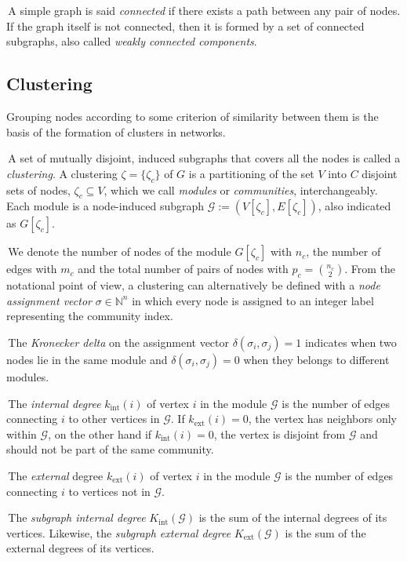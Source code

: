 \documentclass[11pt,              a4paper,              twoside,openright,              titlepage,              headinclude,footinclude,                            numbers=noenddot,              cleardoublepage=empty,]{scrreprt}
\begin{document}
\noindent\textbullet \,A simple graph is said \emph{connected} if there exists a path between any pair of nodes.
If the graph itself is not connected, then it is formed by a set of connected subgraphs, also called \emph{weakly connected components}.


\subsection{Clustering}\label{sec:clustering}
Grouping nodes according to some criterion of similarity between them is the basis of the formation of clusters in networks.

\noindent\textbullet \,A set of mutually disjoint, induced subgraphs that covers all the nodes is called a \emph{clustering}.
A clustering $\zeta = \{\zeta_c\}$ of $G$ is a partitioning of the set $V$ into $C$ disjoint sets of nodes, $\zeta_c \subseteq V$, which we call \emph{modules} or \emph{communities}, interchangeably.
Each module is a node-induced subgraph $\mathcal{G}:=(V[\zeta_c],E[\zeta_c])$, also indicated as $G[\zeta_c]$.

\noindent\textbullet \,We denote the number of nodes of the module $G[\zeta_c]$ with $n_c$, the number of edges with $m_c$ and the total number of pairs of nodes with $p_c=\binom{n_c}{2}$.
From the notational point of view, a clustering can alternatively be defined with a \emph{node assignment vector} $\sigma \in \mathbb{N}^n$ in which every node is assigned to an integer label representing the community index.


\noindent\textbullet \,The \emph{Kronecker delta} on the assignment vector $\delta(\sigma_i,\sigma_j)=1$ indicates when two nodes lie in the same module and $\delta(\sigma_i,\sigma_j)=0$ when they belongs to different modules.

\noindent\textbullet \,The \emph{internal degree} $k_{\textrm{int}}(i)$ of vertex $i$ in the module $\mathcal{G}$ is the number of edges connecting $i$ to other vertices in $\mathcal{G}$.
If $k_{\textrm{ext}}(i)=0$, the vertex has neighbors only within $\mathcal{G}$, on the other hand if $k_{\textrm{int}}(i)=0$, the vertex is disjoint from $\mathcal{G}$ and should not be part of the same community.

\noindent\textbullet \,The \emph{external} degree $k_{\textrm{ext}}(i)$ of vertex $i$ in the module $\mathcal{G}$ is the number of edges connecting $i$ to vertices not in $\mathcal{G}$.

\noindent\textbullet \,The \emph{subgraph internal degree} $K_{\textrm{int}}(\mathcal{G})$ is the sum of the internal degrees of its vertices.
Likewise, the \emph{subgraph external degree} $K_{\textrm{ext}}(\mathcal{G})$ is the sum of the external degrees of its vertices.
\end{document}
